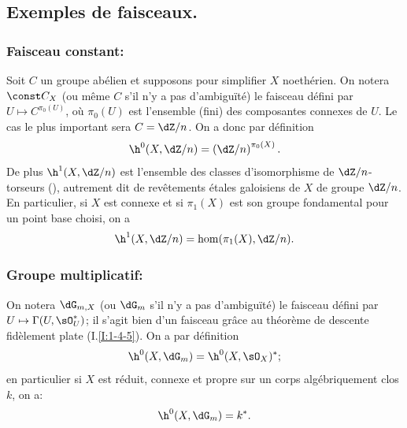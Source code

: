 \subsection{Exemples de faisceaux.}\label{I:2-2}





\subsubsection{Faisceau constant:}\label{I:2-2-1}

Soit $C$ un groupe abélien et supposons pour simplifier $X$ noethérien. On 
notera $\const C_X$ (ou même $C$ s'il n'y a pas d'ambiguïté) le faisceau 
défini par $U\mapsto C^{\pi_0(U)}$, où $\pi_0(U)$ est l'ensemble (fini) des 
composantes connexes de $U$. Le cas le plus important sera $C=\dZ/n$. On a donc 
par définition 
\[
  \h^0(X,\dZ/n)=\left(\dZ/n\right)^{\pi_0(X)}\text{.}
\]
De plus $\h^1(X,\dZ/n)$ est l'ensemble des classes d'isomorphisme de 
$\dZ/n$-torseurs (), autrement dit de revêtements étales 
galoisiens de $X$ de groupe $\dZ/n$. En particulier, si $X$ est connexe et si 
$\pi_1(X)$ est son groupe fondamental pour un point base choisi, on a 
\[
  \h^1(X,\dZ/n) = \hom(\pi_1(X),\dZ/n)\text{.}
\]





\subsubsection{Groupe multiplicatif:}\label{I:2-2-2}

On notera $\dG_{m,X}$ (ou $\dG_m$ s'il n'y a pas d'ambiguïté) le faisceau 
défini par $U\mapsto \Gamma(U,\sO_U^*)$; il s'agit bien d'un faisceau 
grâce au théorème de descente fidèlement plate (I.\ref{I:1-4-5}). On a 
par définition 
\[
  \h^0(X,\dG_m) = \h^0(X,\sO_X)^*\text{;}
\]
en particulier si $X$ est réduit, connexe et propre sur un corps 
algébriquement clos $k$, on a:
\[
  \h^0(X,\dG_m) = k^*\text{.}
\]

